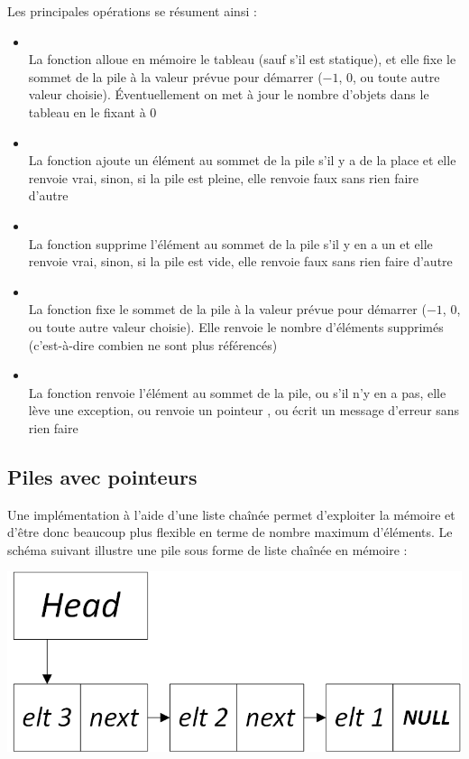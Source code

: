 \documentclass[11pt,a4paper]{article}
\begin{document}
Les principales opérations se résument ainsi :
\begin{itemize}
\item {}\\
      La fonction alloue en mémoire le tableau (sauf s'il est statique), et elle fixe le sommet de la pile à la valeur prévue pour démarrer ($ -1 $, $ 0 $, ou toute autre valeur choisie). Éventuellement on met à jour le nombre d'objets dans le tableau en le fixant à $ 0 $
\item {}\\
      La fonction ajoute un élément au sommet de la pile s'il y a de la place et elle renvoie vrai, sinon, si la pile est pleine, elle renvoie faux sans rien faire d'autre
\item {}\\
      La fonction supprime l'élément au sommet de la pile s'il y en a un et elle renvoie vrai, sinon, si la pile est vide, elle renvoie faux sans rien faire d'autre
\item {}\\
      La fonction fixe le sommet de la pile à la valeur prévue pour démarrer ($ -1 $, $ 0 $, ou toute autre valeur choisie). Elle renvoie le nombre d'éléments supprimés (c'est-à-dire combien ne sont plus référencés)
\item {}\\
      La fonction renvoie l'élément au sommet de la pile, ou s'il n'y en a pas, elle lève une exception, ou renvoie un pointeur , ou écrit un message d'erreur sans rien faire
\end{itemize}


\bigskip


\subsection{Piles avec pointeurs}

\bigskip

Une implémentation à l'aide d'une liste chaînée permet d'exploiter la mémoire et d'être donc beaucoup plus flexible en terme de nombre maximum d'éléments.
Le schéma suivant illustre une pile sous forme de liste chaînée en mémoire :\\

\begin{center}
\includegraphics[scale=0.75]{img/piles/Piles_3_Liste_Chainee_Structure_cas_general.png}
\end{center}
\end{document}
